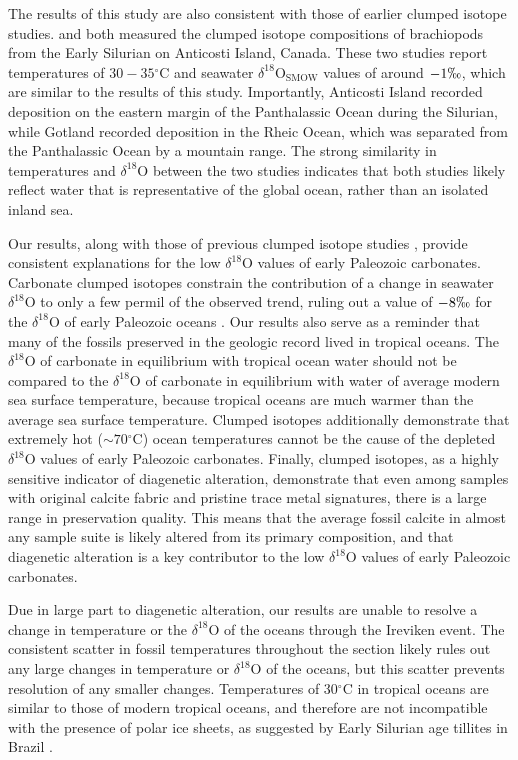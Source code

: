 \documentclass{article}
\newcommand{\deltao}{$\delta^{18}$}
\newcommand{\degrees}{$^{\circ}$}
\begin{document}
The results of this study are also consistent with those of earlier clumped isotope studies. \cite{Came2007} and \cite{Finnegan2011} both measured the clumped isotope compositions of brachiopods from the Early Silurian on Anticosti Island, Canada. These two studies report temperatures of $30-35$\degrees C and seawater \deltao O$_{\text{SMOW}}$ values of around $-1\permil$, which are similar to the results of this study. Importantly, Anticosti Island recorded deposition on the eastern margin of the Panthalassic Ocean during the Silurian, while Gotland recorded deposition in the Rheic Ocean, which was separated from the Panthalassic Ocean by a mountain range. The strong similarity in temperatures and \deltao O between the two studies indicates that both studies likely reflect water that is representative of the global ocean, rather than an isolated inland sea. 

Our results, along with those of previous clumped isotope studies \citep{Came2007,Dennis2013,Finnegan2011}, provide consistent explanations for the low \deltao O values of early Paleozoic carbonates. Carbonate clumped isotopes constrain the contribution of a change in seawater \deltao O to only a few permil of the observed trend, ruling out a value of $-8\permil$ for the \deltao O of early Paleozoic oceans \citep{Grossman2012}. Our results also serve as a reminder that many of the fossils preserved in the geologic record lived in tropical oceans. The \deltao O of carbonate in equilibrium with tropical ocean water should not be compared to the \deltao O of carbonate in equilibrium with water of average modern sea surface temperature, because tropical oceans are much warmer than the average sea surface temperature. Clumped isotopes additionally demonstrate that extremely hot ($\sim 70$\degrees C) ocean temperatures cannot be the cause of the depleted \deltao O values of early Paleozoic carbonates. Finally, clumped isotopes, as a highly sensitive indicator of diagenetic alteration, demonstrate that even among samples with original calcite fabric and pristine trace metal signatures, there is a large range in preservation quality. This means that the average fossil calcite in almost any sample suite is likely altered from its primary composition, and that diagenetic alteration is a key contributor to the low \deltao O values of early Paleozoic carbonates. 

Due in large part to diagenetic alteration, our results are unable to resolve a change in temperature or the \deltao O of the oceans through the Ireviken event. The consistent scatter in fossil temperatures throughout the section likely rules out any large changes in temperature or \deltao O of the oceans, but this scatter prevents resolution of any smaller changes. Temperatures of 30\degrees C in tropical oceans are similar to those of modern tropical oceans, and therefore are not incompatible with the presence of polar ice sheets, as suggested by Early Silurian age tillites in Brazil \citep{Grahn1992}.
\end{document}
